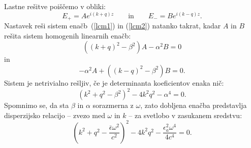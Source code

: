 Lastne rešitve poiščemo v obliki:
\begin{equation}
E_{+}  =  Ae^{i(k+q)z} 
\qquad
\mathrm{in}
\qquad
E_{-}  =  Be^{i(k-q)z}.
\label{7.65}
\end{equation}
Nastavek reši sistem enačb~(\ref{lcm1}) in (\ref{lcm2}) 
natanko takrat, kadar $A$ in $B$ rešita sistem homogenih linearnih enačb:
\begin{equation}
\left((k+q)^{2}-\beta^{2}\right)A-\alpha^{2}B  =  0 
\label{7.66da}
\end{equation}
in
\begin{equation}
-\alpha^{2}A+\left((k-q)^{2}-\beta^{2}\right)B  =  0.
\label{7.66d}
\end{equation}
 Sistem je netrivialno rešljiv, če je determinanta koeficientov enaka
nič:
\begin{equation}
\left(k^{2}+q^{2}-\beta^{2}\right)^{2}\!\!-4k^{2}q^{2}-\alpha^{4}=0.
\label{7.66}
\end{equation}
Spomnimo se, da sta $\beta$ in $\alpha$ sorazmerna z $\omega$,
zato dobljena enačba predstavlja disperzijsko relacijo -- zvezo med 
$\omega$ in $k$ -- za svetlobo v zasukanem sredstvu:
\begin{equation}
\left(k^{2}+q^{2}-\frac{\bar{\epsilon}\omega^{2}}{c^{2}}\right)^{2}\!\!-
4k^{2}q^{2}- \frac{\epsilon_{a}^2\omega^{4}}{4c^{4}}
=0.
\label{7.66a}
\end{equation}

